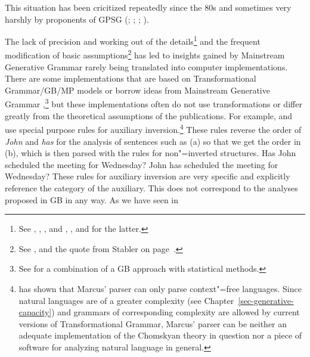 This situation has been cricitized repeatedly since the 80s and sometimes very harshly by proponents of GPSG 
(\citealp*[]{GKPS85a};
\citealp{Pullum85a,Pullum89b}; \citealp[]{Pullum91b}; \citealp{KP90a}). 

\addlines[-1]
The lack of precision and working out of the details\footnote{%
	See \eg {}, , ,  and , ,  and
   for the latter. 
} and the frequent modification of basic assumptions\footnote{%
	See \eg {},  and the quote from Stabler on page~\pageref{Zitat-Stabler}.
} has led to insights gained by Mainstream Generative Grammar rarely being translated into computer implementations.
There are some implementations that are based on Transformational Grammar/GB/MP models or borrow ideas from Mainstream
Generative Grammar
\citep*{Petrick65a-u,ZFHW65a,Kay67a,Friedman69a,FBDPM71a-u,Morin73a-u,Marcus80a-u,AC86a,Kuhns86a,Correra87a,Stabler87a,Stabler92a-u,Stabler2001a,KT91a,Fong91a-u,CL92a,Lohnstein93a-u,FC94a,Nordgard94a,Veenstra98a,%
FG2012a%
},\footnote{%
  See  for a combination of a GB approach with statistical methods.
}
but these implementations often do not use transformations or differ greatly from the theoretical assumptions of the
publications. For example, \citet[--104]{Marcus80a-u} and
\citet[]{Stabler87a} use special purpose rules for auxiliary inversion.\footnote{%
  \citet{NF86a-u,NF87a-u} has shown that Marcus' parser can only parse context"=free languages. Since natural languages
  are of a greater complexity (see Chapter~\ref{sec-generative-capacity}) and grammars of corresponding complexity
  are allowed by current versions of Transformational Grammar, Marcus' parser can be neither an adequate implementation of
  the Chomskyan theory in question nor a piece of software for analyzing natural language in general.
}
These rules reverse the order of \emph{John} and \emph{has} for the analysis of sentences such as (a) so that we get the order in
  (b), which is then parsed with the rules for non"=inverted structures.
\eal
\ex Has John scheduled the meeting for Wednesday?
\ex John has scheduled the meeting for Wednesday?
\zl
These rules for auxiliary inversion are very specific and explicitly reference the category of the auxiliary. This does not correspond
to the analyses proposed in GB in any way. As we have seen in
